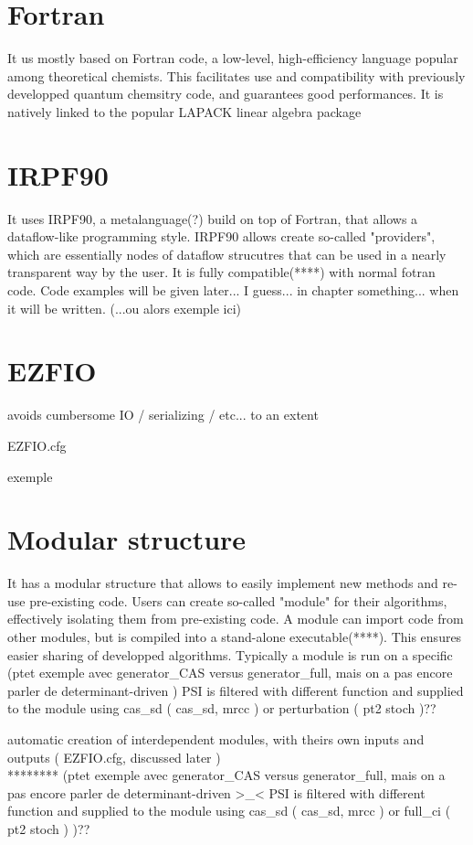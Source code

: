 \documentclass[./thesis.tex]{subfiles}
\begin{document}
\section{Fortran}
It us mostly based on Fortran code, a low-level, high-efficiency language popular among theoretical chemists. This facilitates use and compatibility with previously developped quantum chemsitry code, and guarantees good performances. It is natively linked to the popular LAPACK linear algebra package

\section{IRPF90}
It uses IRPF90, a metalanguage(?) build on top of Fortran, that allows a dataflow-like programming style.
IRPF90 allows create so-called "providers", which are essentially nodes of dataflow strucutres that can be used in a nearly transparent way by the user. It is fully compatible(****) with normal fotran code. Code examples will be given later... I guess... in chapter something... when it will be written.
(...ou alors exemple ici)


\section{EZFIO}


avoids cumbersome IO / serializing / etc... to an extent

EZFIO.cfg

exemple

\section{Modular structure}

It has a modular structure that allows to easily implement new methods and re-use pre-existing code.
Users can create so-called "module" for their algorithms, effectively isolating them from pre-existing code. A module can import code from other modules, but is compiled into a stand-alone executable(****). This ensures easier sharing of developped algorithms.
Typically a module is run on a specific 
(ptet exemple avec generator\_CAS versus generator\_full, mais on a pas encore parler de determinant-driven )
PSI is filtered with different function and supplied to the module using cas\_sd ( cas\_sd, mrcc ) or perturbation ( pt2 stoch )??

automatic creation of interdependent modules, with theirs own inputs and outputs ( EZFIO.cfg, discussed later ) \\
******** (ptet exemple avec generator\_CAS versus generator\_full, mais on a pas encore parler de determinant-driven >\_< PSI is filtered with different function and supplied to the module using cas\_sd ( cas\_sd, mrcc ) or full\_ci ( pt2 stoch ) )?? \\
\end{document}
